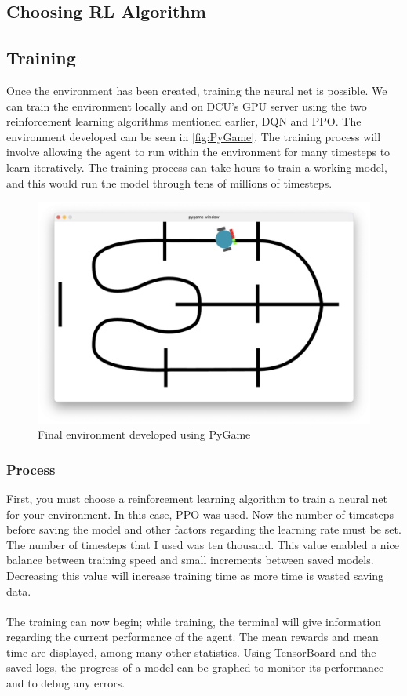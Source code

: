 \documentclass[a4paper,12pt]{article}
\begin{document}
\subsection{Choosing RL Algorithm}

\subsection{Training}
Once the environment has been created, training the neural net is possible. We can train the environment locally and on DCU's GPU server using the two reinforcement learning algorithms mentioned earlier, DQN and PPO. The environment developed can be seen in \autoref{fig:PyGame}. The training process will involve allowing the agent to run within the environment for many timesteps to learn iteratively. The training process can take hours to train a working model, and this would run the model through tens of millions of timesteps. 

\begin{figure}[H]
\centering
\includegraphics[width=12cm]{./imgs/PyGame.png}
\caption{Final environment developed using PyGame}
\label{fig:PyGame}

\end{figure}

\subsubsection{Process}

First, you must choose a reinforcement learning algorithm to train a neural net for your environment. In this case, PPO was used. Now the number of timesteps before saving the model and other factors regarding the learning rate must be set. The number of timesteps that I used was ten thousand. This value enabled a nice balance between training speed and small increments between saved models. Decreasing this value will increase training time as more time is wasted saving data. 
\\\\
The training can now begin; while training, the terminal will give information regarding the current performance of the agent. The mean rewards and mean time are displayed, among many other statistics. Using TensorBoard and the saved logs, the progress of a model can be graphed to monitor its performance and to debug any errors.
\end{document}
